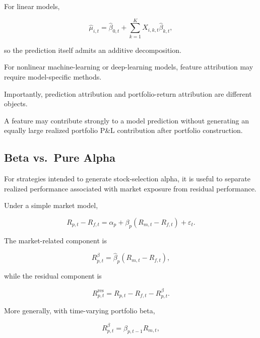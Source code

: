 \documentclass[11pt,a4paper]{article}
\begin{document}
For linear models,

\begin{equation}
\widehat{\mu}_{i,t}
=
\widehat{\beta}_{0,t}
+
\sum_{k=1}^{K}
X_{i,k,t}
\widehat{\beta}_{k,t},
\end{equation}

so the prediction itself admits an additive decomposition.

For nonlinear machine-learning or deep-learning models, feature attribution may
require model-specific methods.

Importantly, prediction attribution and portfolio-return attribution are
different objects.

A feature may contribute strongly to a model prediction without generating an
equally large realized portfolio P\&L contribution after portfolio construction.


\subsection{Beta vs.\ Pure Alpha}

For strategies intended to generate stock-selection alpha, it is useful to
separate realized performance associated with market exposure from residual
performance.

Under a simple market model,

\begin{equation}
R_{p,t}-R_{f,t}
=
\alpha_p
+
\beta_p
\left(
R_{m,t}-R_{f,t}
\right)
+
\varepsilon_t.
\end{equation}

The market-related component is

\begin{equation}
\boxed{
R_{p,t}^{\beta}
=
\widehat{\beta}_p
\left(
R_{m,t}-R_{f,t}
\right),
}
\end{equation}

while the residual component is

\begin{equation}
\boxed{
R_{p,t}^{\mathrm{res}}
=
R_{p,t}-R_{f,t}
-
R_{p,t}^{\beta}.
}
\end{equation}

More generally, with time-varying portfolio beta,

\begin{equation}
\boxed{
R_{p,t}^{\beta}
=
\beta_{p,t-1}
R_{m,t},
}
\end{equation}
\end{document}
